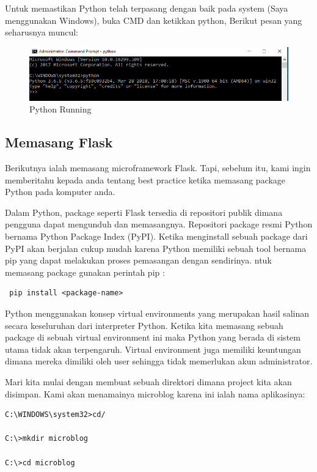 Untuk memastikan Python telah terpasang dengan baik pada system (Saya menggunakan Windows), buka CMD dan ketikkan python,  Berikut pesan yang seharusnya muncul:

\begin{figure}[ht]
\centerline{\includegraphics[width=1\textwidth]{figures/5Python.PNG}}
\caption{Python Running}
\label{gambar}
\end{figure}

\subsection{Memasang Flask}
Berikutnya ialah memasang microframework Flask. Tapi, sebelum itu, kami ingin memberitahu kepada anda tentang best practice ketika memasang package Python pada komputer anda.

Dalam Python, package seperti Flask tersedia di repositori publik dimana pengguna dapat mengunduh dan memasangnya. Repositori package resmi Python bernama Python Package Index (PyPI). Ketika menginstall sebuah package dari PyPI akan berjalan cukup mudah karena Python memiliki sebuah tool bernama pip yang dapat melakukan proses pemasangan dengan sendirinya. ntuk memasang package gunakan perintah pip :

\begin{verbatim}
 pip install <package-name>
\end{verbatim}

Python menggunakan konsep virtual environments yang merupakan hasil salinan secara keseluruhan dari interpreter Python. Ketika kita memasang sebuah package di sebuah virtual environment ini maka Python yang berada di sistem utama tidak akan terpengaruh. Virtual environment juga memiliki keuntungan dimana mereka dimiliki oleh user sehingga tidak memerlukan akun administrator.

Mari kita mulai dengan membuat sebuah direktori dimana project kita akan disimpan. Kami akan menamainya microblog karena ini ialah nama aplikasinya:

\begin{verbatim}
C:\WINDOWS\system32>cd/

C:\>mkdir microblog

C:\>cd microblog
\end{verbatim}

